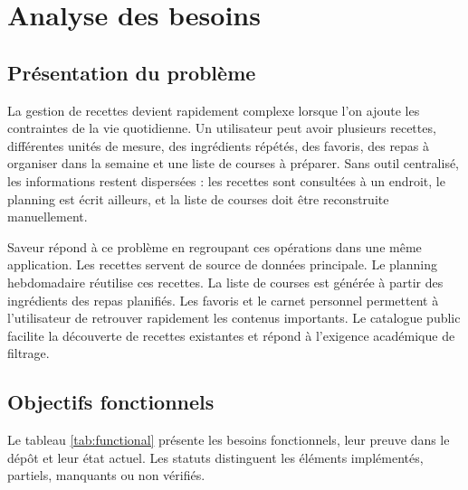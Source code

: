 \documentclass[12pt,a4paper]{report}
\begin{document}
\chapter{Analyse des besoins}
\section{Présentation du problème}
La gestion de recettes devient rapidement complexe lorsque l'on ajoute les contraintes de la vie quotidienne. Un utilisateur peut avoir plusieurs recettes, différentes unités de mesure, des ingrédients répétés, des favoris, des repas à organiser dans la semaine et une liste de courses à préparer. Sans outil centralisé, les informations restent dispersées : les recettes sont consultées à un endroit, le planning est écrit ailleurs, et la liste de courses doit être reconstruite manuellement.

Saveur répond à ce problème en regroupant ces opérations dans une même application. Les recettes servent de source de données principale. Le planning hebdomadaire réutilise ces recettes. La liste de courses est générée à partir des ingrédients des repas planifiés. Les favoris et le carnet personnel permettent à l'utilisateur de retrouver rapidement les contenus importants. Le catalogue public facilite la découverte de recettes existantes et répond à l'exigence académique de filtrage.

\section{Objectifs fonctionnels}
Le tableau \ref{tab:functional} présente les besoins fonctionnels, leur preuve dans le dépôt et leur état actuel. Les statuts distinguent les éléments implémentés, partiels, manquants ou non vérifiés.
\end{document}
